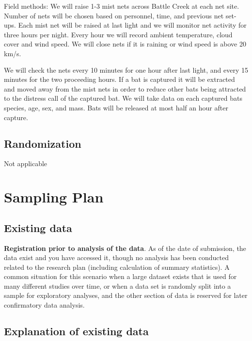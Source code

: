 \documentclass[]{article}
\begin{document}
Field methods: We will raise 1-3 mist nets across Battle Creek at each
net site. Number of nets will be chosen based on personnel, time, and
previous net set-ups. Each mist net will be raised at last light and we
will monitor net activity for three hours per night. Every hour we will
record ambient temperature, cloud cover and wind speed. We will close
nets if it is raining or wind speed is above 20 km/s.

We will check the nets every 10 minutes for one hour after last light,
and every 15 minutes for the two proceeding hours. If a bat is captured
it will be extracted and moved away from the mist nets in order to
reduce other bats being attracted to the distress call of the captured
bat. We will take data on each captured bats species, age, sex, and
mass. Bats will be released at most half an hour after capture.

\hypertarget{randomization}{%
\subsection{Randomization}\label{randomization}}

Not applicable

\hypertarget{sampling-plan}{%
\section{Sampling Plan}\label{sampling-plan}}

\hypertarget{existing-data}{%
\subsection{Existing data}\label{existing-data}}

\textbf{Registration prior to analysis of the data}. As of the date of
submission, the data exist and you have accessed it, though no analysis
has been conducted related to the research plan (including calculation
of summary statistics). A common situation for this scenario when a
large dataset exists that is used for many different studies over time,
or when a data set is randomly split into a sample for exploratory
analyses, and the other section of data is reserved for later
confirmatory data analysis.

\hypertarget{explanation-of-existing-data}{%
\subsection{Explanation of existing
data}\label{explanation-of-existing-data}}
\end{document}
